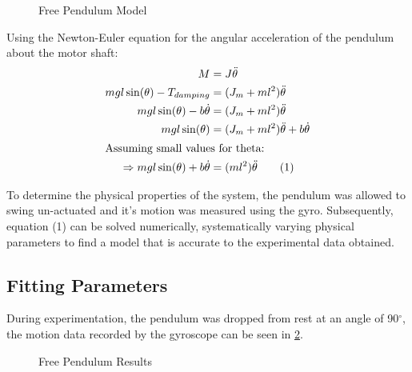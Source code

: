 \documentclass[11pt, a4paper,twocolumn]{article}
\begin{document}
\begin{figure}[h!]
\centering
\caption{Free Pendulum Model}
\label{fig:pend}
\end{figure}

Using the Newton-Euler equation for the angular acceleration of the pendulum about the motor shaft:
\begin{align*}
	M &= J\ddot{\theta}	\\
	mgl\sin(\theta)-T_{damping} &= (J_m + ml^2)\ddot{\theta}\\
	mgl\sin(\theta) - b\dot\theta &= (J_m+ml^2)\ddot{\theta}\\
	mgl\sin(\theta) &= (J_m + ml^2)\ddot{\theta} + b\dot\theta\\
	\intertext{Assuming small values for theta:}
	\Rightarrow mgl\sin(\theta) + b\dot\theta &= (ml^2)\ddot{\theta} \qquad \text{(1)}\\
\end{align*}

To determine the physical properties of the system, the pendulum was allowed to swing un-actuated and it's motion was measured using the gyro. Subsequently, equation (1) can be solved numerically, systematically varying physical parameters to find a model that is accurate to the experimental data obtained.

\subsection{	Fitting Parameters	}

	During experimentation, the pendulum was dropped from rest at an angle of 90$^\circ$, the motion data recorded by the gyroscope can be seen in \ref{fig:free_pend}.

\begin{figure}[h!]
\centering
\caption{Free Pendulum Results}
\label{fig:free_pend}
\end{figure}
\end{document}

